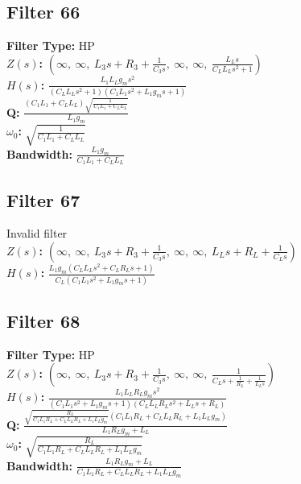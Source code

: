 \documentclass{article}
\begin{document}
\subsection*{Filter 66}
\textbf{Filter Type:} HP \\ 
\textbf{$Z(s)$:} $\left( \infty, \  \infty, \  L_{3} s + R_{3} + \frac{1}{C_{3} s}, \  \infty, \  \infty, \  \frac{L_{L} s}{C_{L} L_{L} s^{2} + 1}\right)$ \\ 
\textbf{$H(s)$:} $\frac{L_{1} L_{L} g_{m} s^{2}}{\left(C_{L} L_{L} s^{2} + 1\right) \left(C_{1} L_{1} s^{2} + L_{1} g_{m} s + 1\right)}$ \\ 
\textbf{Q:} $\frac{\left(C_{1} L_{1} + C_{L} L_{L}\right) \sqrt{\frac{1}{C_{1} L_{1} + C_{L} L_{L}}}}{L_{1} g_{m}}$ \\ 
\textbf{$\omega_0$:} $\sqrt{\frac{1}{C_{1} L_{1} + C_{L} L_{L}}}$ \\ 
\textbf{Bandwidth:} $\frac{L_{1} g_{m}}{C_{1} L_{1} + C_{L} L_{L}}$ \\ 
\subsection*{Filter 67}
Invalid filter \\ 
\textbf{$Z(s)$:} $\left( \infty, \  \infty, \  L_{3} s + R_{3} + \frac{1}{C_{3} s}, \  \infty, \  \infty, \  L_{L} s + R_{L} + \frac{1}{C_{L} s}\right)$ \\ 
\textbf{$H(s)$:} $\frac{L_{1} g_{m} \left(C_{L} L_{L} s^{2} + C_{L} R_{L} s + 1\right)}{C_{L} \left(C_{1} L_{1} s^{2} + L_{1} g_{m} s + 1\right)}$ \\ 
\subsection*{Filter 68}
\textbf{Filter Type:} HP \\ 
\textbf{$Z(s)$:} $\left( \infty, \  \infty, \  L_{3} s + R_{3} + \frac{1}{C_{3} s}, \  \infty, \  \infty, \  \frac{1}{C_{L} s + \frac{1}{R_{L}} + \frac{1}{L_{L} s}}\right)$ \\ 
\textbf{$H(s)$:} $\frac{L_{1} L_{L} R_{L} g_{m} s^{2}}{\left(C_{1} L_{1} s^{2} + L_{1} g_{m} s + 1\right) \left(C_{L} L_{L} R_{L} s^{2} + L_{L} s + R_{L}\right)}$ \\ 
\textbf{Q:} $\frac{\sqrt{\frac{R_{L}}{C_{1} L_{1} R_{L} + C_{L} L_{L} R_{L} + L_{1} L_{L} g_{m}}} \left(C_{1} L_{1} R_{L} + C_{L} L_{L} R_{L} + L_{1} L_{L} g_{m}\right)}{L_{1} R_{L} g_{m} + L_{L}}$ \\ 
\textbf{$\omega_0$:} $\sqrt{\frac{R_{L}}{C_{1} L_{1} R_{L} + C_{L} L_{L} R_{L} + L_{1} L_{L} g_{m}}}$ \\ 
\textbf{Bandwidth:} $\frac{L_{1} R_{L} g_{m} + L_{L}}{C_{1} L_{1} R_{L} + C_{L} L_{L} R_{L} + L_{1} L_{L} g_{m}}$ \\ 
\end{document}
